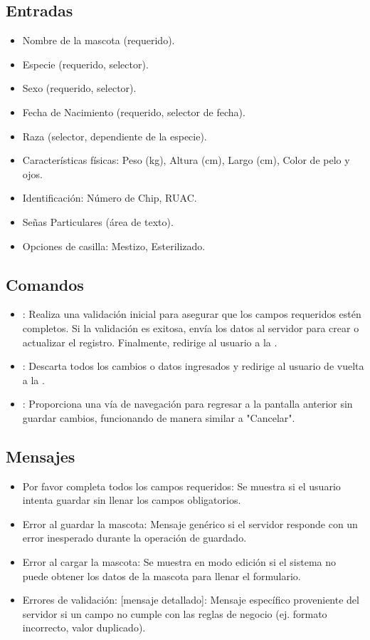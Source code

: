 \subsection{Entradas}
\begin{itemize}
    \item Nombre de la mascota (requerido).
    \item Especie (requerido, selector).
    \item Sexo (requerido, selector).
    \item Fecha de Nacimiento (requerido, selector de fecha).
    \item Raza (selector, dependiente de la especie).
    \item Características físicas: Peso (kg), Altura (cm), Largo (cm), Color de pelo y ojos.
    \item Identificación: Número de Chip, RUAC.
    \item Señas Particulares (área de texto).
    \item Opciones de casilla: Mestizo, Esterilizado.
\end{itemize}

\subsection{Comandos}
\begin{itemize}
    \item {}: Realiza una validación inicial para asegurar que los campos requeridos estén completos. Si la validación es exitosa, envía los datos al servidor para crear o actualizar el registro. Finalmente, redirige al usuario a la .
    \item {}: Descarta todos los cambios o datos ingresados y redirige al usuario de vuelta a la .
    \item {}: Proporciona una vía de navegación para regresar a la pantalla anterior sin guardar cambios, funcionando de manera similar a "Cancelar".
\end{itemize}

\subsection{Mensajes}
\begin{itemize}
    \item Por favor completa todos los campos requeridos: Se muestra si el usuario intenta guardar sin llenar los campos obligatorios.
    \item Error al guardar la mascota: Mensaje genérico si el servidor responde con un error inesperado durante la operación de guardado.
    \item Error al cargar la mascota: Se muestra en modo edición si el sistema no puede obtener los datos de la mascota para llenar el formulario.
    \item Errores de validación: [mensaje detallado]: Mensaje específico proveniente del servidor si un campo no cumple con las reglas de negocio (ej. formato incorrecto, valor duplicado).
\end{itemize}

